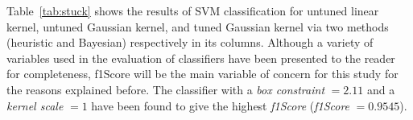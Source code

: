 





Table~\ref{tab:stuck} shows the results of SVM classification for untuned linear kernel, untuned Gaussian kernel, and tuned Gaussian kernel via two methods (heuristic and Bayesian) respectively in its columns.  
Although a variety of variables used in the evaluation of classifiers have been presented to the reader for completeness, f1Score will be the main variable of concern for this study for the reasons explained before. 
The classifier with a \emph{box constraint} $= 2.11$ and a \emph{kernel scale} $ = 1$ have been found to give the highest \emph{f1Score} (\emph{f1Score} $= 0.9545$). 


